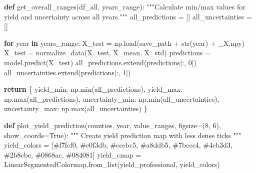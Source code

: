 \documentclass[
  letterpaper,
  DIV=11,
  numbers=noendperiod]{scrreprt}
\newenvironment{Shaded}{\begin{snugshade}}{\end{snugshade}}
\newcommand{\BuiltInTok}[1]{\textcolor[rgb]{0.00,0.23,0.31}{#1}}
\newcommand{\CommentTok}[1]{\textcolor[rgb]{0.37,0.37,0.37}{#1}}
\newcommand{\ControlFlowTok}[1]{\textcolor[rgb]{0.00,0.23,0.31}{\textbf{#1}}}
\newcommand{\DecValTok}[1]{\textcolor[rgb]{0.68,0.00,0.00}{#1}}
\newcommand{\KeywordTok}[1]{\textcolor[rgb]{0.00,0.23,0.31}{\textbf{#1}}}
\newcommand{\NormalTok}[1]{\textcolor[rgb]{0.00,0.23,0.31}{#1}}
\newcommand{\OperatorTok}[1]{\textcolor[rgb]{0.37,0.37,0.37}{#1}}
\newcommand{\StringTok}[1]{\textcolor[rgb]{0.13,0.47,0.30}{#1}}
\newcommand{\VariableTok}[1]{\textcolor[rgb]{0.07,0.07,0.07}{#1}}
\begin{document}
\begin{Shaded}
\begin{Highlighting}[]
\KeywordTok{def}\NormalTok{ get\_overall\_ranges(df\_all, years\_range):}
    \CommentTok{"""Calculate min/max values for yield and uncertainty across all years."""}
\NormalTok{    all\_predictions }\OperatorTok{=}\NormalTok{ []}
\NormalTok{    all\_uncertainties }\OperatorTok{=}\NormalTok{ []}

    \ControlFlowTok{for}\NormalTok{ year }\KeywordTok{in}\NormalTok{ years\_range:}
\NormalTok{        X\_test }\OperatorTok{=}\NormalTok{ np.load(save\_path }\OperatorTok{+} \BuiltInTok{str}\NormalTok{(year) }\OperatorTok{+} \StringTok{\textquotesingle{}\_X.npy\textquotesingle{}}\NormalTok{)}
\NormalTok{        X\_test }\OperatorTok{=}\NormalTok{ normalize\_data(X\_test, X\_mean, X\_std)}
\NormalTok{        predictions }\OperatorTok{=}\NormalTok{ model.predict(X\_test)}
\NormalTok{        all\_predictions.extend(predictions[:, }\DecValTok{0}\NormalTok{])}
\NormalTok{        all\_uncertainties.extend(predictions[:, }\DecValTok{1}\NormalTok{])}

    \ControlFlowTok{return}\NormalTok{ \{}
        \StringTok{\textquotesingle{}yield\_min\textquotesingle{}}\NormalTok{: np.}\BuiltInTok{min}\NormalTok{(all\_predictions),}
        \StringTok{\textquotesingle{}yield\_max\textquotesingle{}}\NormalTok{: np.}\BuiltInTok{max}\NormalTok{(all\_predictions),}
        \StringTok{\textquotesingle{}uncertainty\_min\textquotesingle{}}\NormalTok{: np.}\BuiltInTok{min}\NormalTok{(all\_uncertainties),}
        \StringTok{\textquotesingle{}uncertainty\_max\textquotesingle{}}\NormalTok{: np.}\BuiltInTok{max}\NormalTok{(all\_uncertainties)}
\NormalTok{    \}}

\KeywordTok{def}\NormalTok{ plot\_yield\_prediction(counties, year, value\_ranges, figsize}\OperatorTok{=}\NormalTok{(}\DecValTok{8}\NormalTok{, }\DecValTok{6}\NormalTok{), show\_coords}\OperatorTok{=}\VariableTok{True}\NormalTok{):}
    \CommentTok{"""}
\CommentTok{    Create yield prediction map with less dense ticks}
\CommentTok{    """}
\NormalTok{    yield\_colors }\OperatorTok{=}\NormalTok{ [}\StringTok{\textquotesingle{}\#f7fcf0\textquotesingle{}}\NormalTok{, }\StringTok{\textquotesingle{}\#e0f3db\textquotesingle{}}\NormalTok{, }\StringTok{\textquotesingle{}\#ccebc5\textquotesingle{}}\NormalTok{, }\StringTok{\textquotesingle{}\#a8ddb5\textquotesingle{}}\NormalTok{, }\StringTok{\textquotesingle{}\#7bccc4\textquotesingle{}}\NormalTok{,}
                   \StringTok{\textquotesingle{}\#4eb3d3\textquotesingle{}}\NormalTok{, }\StringTok{\textquotesingle{}\#2b8cbe\textquotesingle{}}\NormalTok{, }\StringTok{\textquotesingle{}\#0868ac\textquotesingle{}}\NormalTok{, }\StringTok{\textquotesingle{}\#084081\textquotesingle{}}\NormalTok{]}
\NormalTok{    yield\_cmap }\OperatorTok{=}\NormalTok{ LinearSegmentedColormap.from\_list(}\StringTok{\textquotesingle{}yield\_professional\textquotesingle{}}\NormalTok{, yield\_colors)}


\end{Highlighting}
\end{Shaded}
\end{document}
